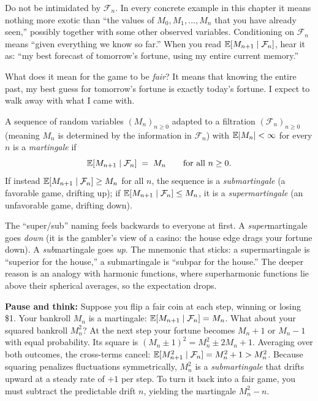 \begin{intuitionbox}
Do not be intimidated by $\mathcal{F}_n$. In every concrete example in this chapter it means nothing
more exotic than ``the values of $M_0, M_1, \dots, M_n$ that you have already seen,'' possibly together
with some other observed variables. Conditioning on $\mathcal{F}_n$ means ``given everything we
know so far.'' When you read $\operatorname{\mathbb{E}}[M_{n+1} \mid \mathcal{F}_n]$, hear it as: ``my best forecast of
tomorrow's fortune, using my entire current memory.''
\end{intuitionbox}

What does it mean for the game to be \emph{fair}? It means that knowing the entire past, my best guess
for tomorrow's fortune is exactly today's fortune. I expect to walk away with what I came with. 

\begin{definition}[Martingale]
\label{ch28:def-mtg}
A sequence of random variables $(M_n)_{n \ge 0}$ adapted to a filtration $(\mathcal{F}_n)_{n\ge 0}$
(meaning $M_n$ is determined by the information in $\mathcal{F}_n$) with $\operatorname{\mathbb{E}}\lvert M_n\rvert < \infty$ for every
$n$ is a \emph{martingale} if
\[
  \operatorname{\mathbb{E}}[M_{n+1} \mid \mathcal{F}_n] \;=\; M_n \qquad \text{for all } n \ge 0.
\]
If instead $\operatorname{\mathbb{E}}[M_{n+1} \mid \mathcal{F}_n] \ge M_n$ for all $n$, the sequence is a
\emph{submartingale} (a favorable game, drifting up); if $\operatorname{\mathbb{E}}[M_{n+1} \mid \mathcal{F}_n] \le M_n$, it
is a \emph{supermartingale} (an unfavorable game, drifting down).
\end{definition}

\begin{trapbox}
The ``super/sub'' naming feels backwards to everyone at first. A \emph{super}martingale goes
\emph{down} (it is the gambler's view of a casino: the house edge drags your fortune down). A
\emph{sub}martingale goes \emph{up}. The mnemonic that sticks: a supermartingale is ``superior for the
house,'' a submartingale is ``subpar for the house.'' The deeper reason is an analogy with harmonic
functions, where superharmonic functions lie above their spherical averages, so the expectation drops.
\end{trapbox}

\begin{walkbox}
\textbf{Pause and think:} Suppose you flip a fair coin at each step, winning or losing \$1. Your bankroll
$M_n$ is a martingale: $\operatorname{\mathbb{E}}[M_{n+1}\mid\mathcal{F}_n] = M_n$. What about your squared bankroll $M_n^2$?
At the next step your fortune becomes $M_n + 1$ or $M_n - 1$ with equal probability. Its square is
$(M_n \pm 1)^2 = M_n^2 \pm 2M_n + 1$. Averaging over both outcomes, the cross-terms cancel:
$\operatorname{\mathbb{E}}[M_{n+1}^2 \mid \mathcal{F}_n] = M_n^2 + 1 > M_n^2$. Because squaring penalizes fluctuations
symmetrically, $M_n^2$ is a \emph{submartingale} that drifts upward at a steady rate of $+1$ per step. To
turn it back into a fair game, you must subtract the predictable drift $n$, yielding the martingale
$M_n^2 - n$.
\end{walkbox}

